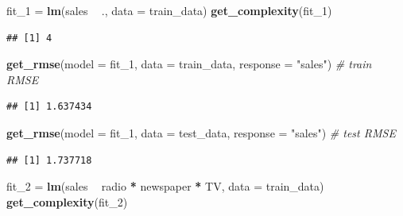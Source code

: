 \documentclass[]{report}
\newenvironment{Shaded}{\begin{snugshade}}{\end{snugshade}}
\newcommand{\KeywordTok}[1]{\textcolor[rgb]{0.13,0.29,0.53}{\textbf{#1}}}
\newcommand{\DataTypeTok}[1]{\textcolor[rgb]{0.13,0.29,0.53}{#1}}
\newcommand{\DecValTok}[1]{\textcolor[rgb]{0.00,0.00,0.81}{#1}}
\newcommand{\StringTok}[1]{\textcolor[rgb]{0.31,0.60,0.02}{#1}}
\newcommand{\CommentTok}[1]{\textcolor[rgb]{0.56,0.35,0.01}{\textit{#1}}}
\newcommand{\OperatorTok}[1]{\textcolor[rgb]{0.81,0.36,0.00}{\textbf{#1}}}
\newcommand{\NormalTok}[1]{#1}
\begin{document}
\begin{Shaded}
\begin{Highlighting}[]
\NormalTok{fit_}\DecValTok{1}\NormalTok{ =}\StringTok{ }\KeywordTok{lm}\NormalTok{(sales }\OperatorTok{~}\StringTok{ }\NormalTok{., }\DataTypeTok{data =}\NormalTok{ train_data)}
\KeywordTok{get_complexity}\NormalTok{(fit_}\DecValTok{1}\NormalTok{)}
\end{Highlighting}
\end{Shaded}

\begin{verbatim}
## [1] 4
\end{verbatim}

\begin{Shaded}
\begin{Highlighting}[]
\KeywordTok{get_rmse}\NormalTok{(}\DataTypeTok{model =}\NormalTok{ fit_}\DecValTok{1}\NormalTok{, }\DataTypeTok{data =}\NormalTok{ train_data, }\DataTypeTok{response =} \StringTok{"sales"}\NormalTok{) }\CommentTok{# train RMSE}
\end{Highlighting}
\end{Shaded}

\begin{verbatim}
## [1] 1.637434
\end{verbatim}

\begin{Shaded}
\begin{Highlighting}[]
\KeywordTok{get_rmse}\NormalTok{(}\DataTypeTok{model =}\NormalTok{ fit_}\DecValTok{1}\NormalTok{, }\DataTypeTok{data =}\NormalTok{ test_data, }\DataTypeTok{response =} \StringTok{"sales"}\NormalTok{) }\CommentTok{# test RMSE}
\end{Highlighting}
\end{Shaded}

\begin{verbatim}
## [1] 1.737718
\end{verbatim}

\begin{Shaded}
\begin{Highlighting}[]
\NormalTok{fit_}\DecValTok{2}\NormalTok{ =}\StringTok{ }\KeywordTok{lm}\NormalTok{(sales }\OperatorTok{~}\StringTok{ }\NormalTok{radio }\OperatorTok{*}\StringTok{ }\NormalTok{newspaper }\OperatorTok{*}\StringTok{ }\NormalTok{TV, }\DataTypeTok{data =}\NormalTok{ train_data)}
\KeywordTok{get_complexity}\NormalTok{(fit_}\DecValTok{2}\NormalTok{)}
\end{Highlighting}
\end{Shaded}
\end{document}
